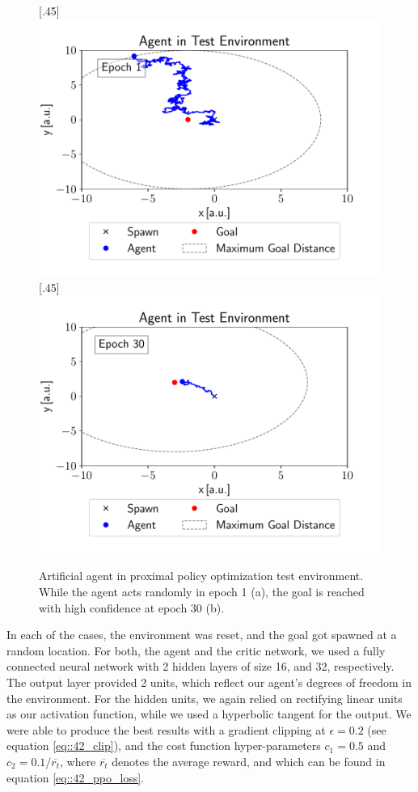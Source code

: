 \begin{figure}[h!]
	\centering
	[.45\linewidth]{\includegraphics[scale=.45]{chapters/11_autonomous_walking_experiments/img/epoch_1.pdf}}	
	[.45\linewidth]{\includegraphics[scale=.45]{chapters/11_autonomous_walking_experiments/img/epoch_30.pdf}}
	\caption{Artificial agent in proximal policy optimization test environment. While the agent acts randomly in epoch 1 (a), the goal is reached with high confidence at epoch 30 (b).}	
	\label{fig::431_ppo_env}
\end{figure} 
In each of the cases, the environment was reset, and the goal got spawned at a random location. For both, the agent and the critic network, we used a fully connected neural network with 2 hidden layers of size 16, and 32, respectively. The output layer provided 2 units, which reflect our agent's degrees of freedom in the environment. For the hidden units, we again relied on rectifying linear units as our activation function, while we used a hyperbolic tangent for the output. We were able to produce the best results with a gradient clipping at $\epsilon=0.2$ (see equation \ref{eq::42_clip}), and the cost function hyper-parameters $c_1 = 0.5$ and $c_2 = 0.1/\overline{r_t}$, where $\overline{r_t}$ denotes the average reward, and which can be found in equation \ref{eq::42_ppo_loss}. 
